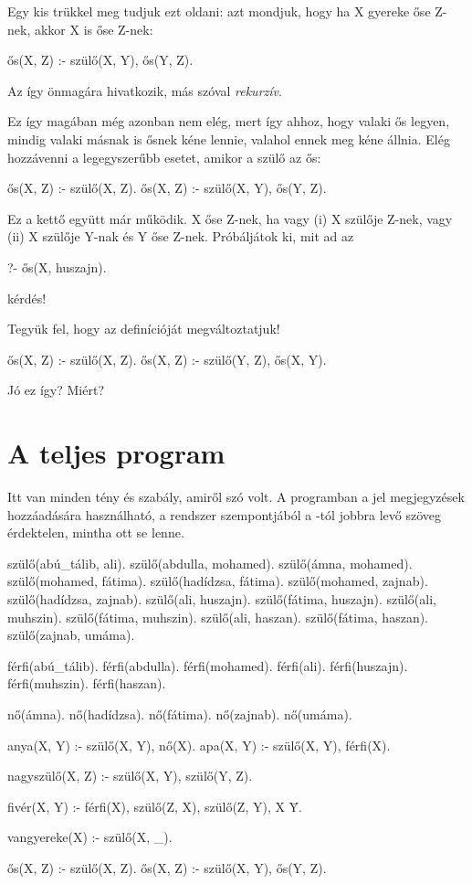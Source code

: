 Egy kis trükkel meg tudjuk ezt oldani: azt mondjuk,
hogy ha X gyereke őse Z-nek, akkor X is őse Z-nek:
\begin{program}
ős(X, Z) :- szülő(X, Y), ős(Y, Z).
\end{program}
Az  így önmagára hivatkozik, más szóval
\emph{rekurzív}.

Ez így magában még azonban nem elég, mert így ahhoz,
hogy valaki ős legyen, mindig valaki másnak is ősnek
kéne lennie, valahol ennek meg kéne állnia. Elég
hozzávenni a legegyszerűbb esetet, amikor a szülő az
ős:
\begin{program}
ős(X, Z) :- szülő(X, Z).
ős(X, Z) :- szülő(X, Y), ős(Y, Z).
\end{program}
Ez a kettő együtt már működik. X őse Z-nek, ha vagy
(i) X szülője Z-nek, vagy (ii) X szülője Y-nak és Y
őse Z-nek. Próbáljátok ki, mit ad az
\begin{query}
?- ős(X, huszajn).
\end{query}
kérdés!

\begin{problem}
Tegyük fel, hogy az  definícióját
megváltoztatjuk!
\begin{program}
ős(X, Z) :- szülő(X, Z).
ős(X, Z) :- szülő(Y, Z), ős(X, Y).
\end{program}
Jó ez így? Miért?
\end{problem}

\section*{A teljes program}

Itt van minden tény és szabály, amiről szó volt. A
programban a \pr{\%} jel megjegyzések hozzáadására
használható, a rendszer szempontjából a \pr{\%}-tól
jobbra levő szöveg érdektelen, mintha ott se
lenne.

\begin{program}
szülő(abú_tálib, ali).
szülő(abdulla, mohamed).
szülő(ámna, mohamed).
szülő(mohamed, fátima).
szülő(hadídzsa, fátima).
szülő(mohamed, zajnab).
szülő(hadídzsa, zajnab).
szülő(ali, huszajn).
szülő(fátima, huszajn).
szülő(ali, muhszin).
szülő(fátima, muhszin).
szülő(ali, haszan).
szülő(fátima, haszan).
szülő(zajnab, umáma).

férfi(abú_tálib).
férfi(abdulla).
férfi(mohamed).
férfi(ali).
férfi(huszajn).
férfi(muhszin).
férfi(haszan).

nő(ámna).
nő(hadídzsa).
nő(fátima).
nő(zajnab).
nő(umáma).

anya(X, Y) :- szülő(X, Y), nő(X).   %
apa(X, Y) :- szülő(X, Y), férfi(X). %

nagyszülő(X, Z) :- szülő(X, Y), szülő(Y, Z).

fivér(X, Y) :-
    férfi(X),
    szülő(Z, X), szülő(Z, Y),
    X \= Y.

vangyereke(X) :- szülő(X, _).

ős(X, Z) :- szülő(X, Z).
ős(X, Z) :- szülő(X, Y), ős(Y, Z).
\end{program}

